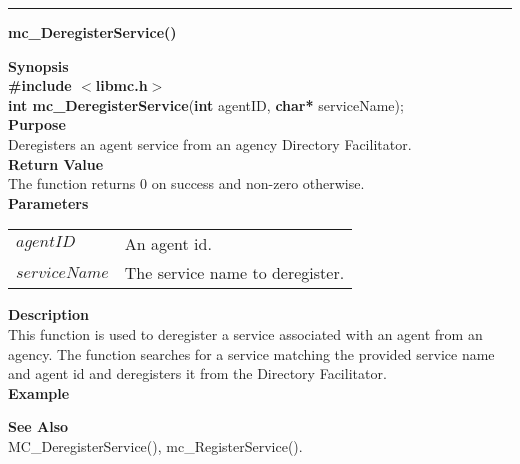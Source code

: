 \noindent
\vspace{5pt}
\rule{6.5in}{0.015in}
\noindent
{}
{\LARGE \bf mc\_DeregisterService()}\\
\label{api:mc_DeregisterService()}

\noindent
{\bf Synopsis}\\
{\bf \#include $<$libmc.h$>$}\\
{\bf int mc\_DeregisterService}({\bf int} agentID, {\bf char*} serviceName);\\

\noindent
{\bf Purpose}\\
Deregisters an agent service from an agency Directory Facilitator.\\

\noindent
{\bf Return Value}\\
The function returns 0 on success and non-zero otherwise.\\

\noindent
{\bf Parameters}
\vspace{-0.1in}
\begin{description}
\item
\begin{tabular}{p{23 mm}p{145 mm}} 
$agentID$ & An agent id. \\
$serviceName$ & The service name to deregister.
\end{tabular}
\end{description}

\noindent
{\bf Description}\\
This function is used to deregister a service associated with an agent
from an agency. The function searches for a service matching the
provided service name and agent id and deregisters it from the
Directory Facilitator. \\

\noindent
{\bf Example}\\
\noindent
{\footnotesize}

\noindent
{\bf See Also}\\
MC\_DeregisterService(), mc\_RegisterService().

